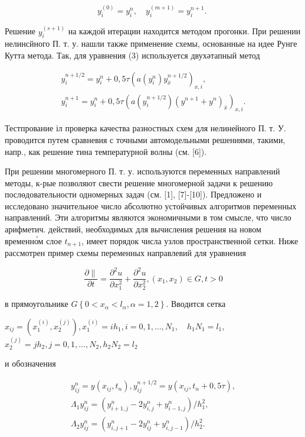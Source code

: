 \documentclass[10pt]{article}
\begin{document}
\[
y_{i}^{(0)}=y_{i}^{n}, \quad y_{i}^{(m+1)}=y_{i}^{n+1} \text {. }
\]

Решение $y_{i}^{(s+1)}$ на каждой итерации находится методом прогонки. При решении нелинсйного П. т. у. нашли также применение схемы, основанные на идее Рунге Кутта метода. Так, для уравнения (3) используется двухәтапный метод

\[
\begin{gathered}
y_{i}^{n+1 / 2}=y_{i}^{n}+0,5 \tau\left(a\left(y_{i}^{n}\right) y_{\bar{x}}^{n+1 / 2}\right)_{x, i}, \\
y_{i}^{n+1}=y_{i}^{n}+0,5 \tau\left(a\left(y_{i}^{n+1 / 2}\right)\left(y^{n+1}+y^{n}\right)_{\bar{x}}\right)_{x, i} .
\end{gathered}
\]

Тестпрование іл проверка качества разностных схем для нелинейного П. т. У. проводится путем сравневия с точными автомодельными решениями, такими, напр., как решение тина температурной волны (см. [6]).

При решении многомерного П. т. у. используются переменных направлений методы, к-рые позволяют свести решение многомерной задачи к решению послөдовательности одномерных задач (см. [1], [7]-[10]). Предложено и исследовано значительное число абсолютно устойчивых алгоритмов переменных направлений. Эти алгоритмы являются экономичными в том смысле, что число арифметич. действий, необходимых для вычисления решения на новом временно́м слое $t_{n+1}$, имеет порядок числа узлов пространственной сетки. Ниже рассмотрен пример схемы переменных направлевий для уравнения

\[
\frac{\partial \|}{\partial t}=\frac{\partial^{2} u}{\partial x_{1}^{2}}+\frac{\partial^{2} u}{\partial x_{2}^{2}},\left(x_{1}, x_{2}\right) \in G, t>0
\]

в прямоугольнике $G\left\{0<x_{\alpha}<l_{\alpha}, \alpha=1,2\right\}$. Вводится сетка

$x_{i j}=\left(x_{1}^{(i)}, x_{2}^{(j)}\right), x_{1}^{(i)}=i h_{1}, i=0,1, \ldots, N_{1}, \quad h_{1} N_{1}=l_{1}$, $x_{2}^{(j)}=j h_{2}, j=0,1, \ldots, N_{2}, h_{2} N_{2}=l_{2}$

и обозначения

\[
\begin{gathered}
y_{i j}^{n}=y\left(x_{i j}, t_{n}\right), y_{i j}^{n+1 / 2}=y\left(x_{i j}, t_{n}+0,5 \tau\right), \\
\Lambda_{1} y_{i j}^{n}=\left(y_{i+1, j}^{n}-2 y_{i, j}^{n}+y_{i-1, j}^{n}\right) / h_{1}^{2}, \\
\Lambda_{2} y_{i j}^{n}=\left(y_{i, j+1}^{n}-2 y_{i j}^{n}+y_{i, j-1}^{n}\right) / h_{2}^{2} .
\end{gathered}
\]
\end{document}
